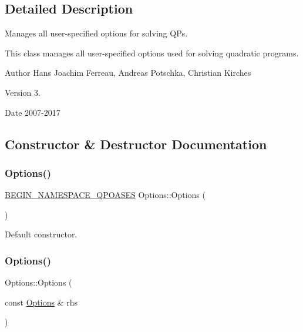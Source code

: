 \subsection{Detailed Description}
Manages all user-\/specified options for solving Q\+Ps. 

This class manages all user-\/specified options used for solving quadratic programs.

\begin{DoxyAuthor}{Author}
Hans Joachim Ferreau, Andreas Potschka, Christian Kirches 
\end{DoxyAuthor}
\begin{DoxyVersion}{Version}
3. 
\end{DoxyVersion}
\begin{DoxyDate}{Date}
2007-\/2017 
\end{DoxyDate}


\subsection{Constructor \& Destructor Documentation}
\mbox{\label{class_options_aeaece707f540fe3efef777a934e3d273}} 
\subsubsection{\texorpdfstring{Options()}{Options()}\hspace{0.1cm}{\footnotesize\ttfamily [1/2]}}
{\footnotesize\ttfamily \hyperlink{_types_8hpp_afd127fcb3c8f47975e9fa0ec2bacde52}{B\+E\+G\+I\+N\+\_\+\+N\+A\+M\+E\+S\+P\+A\+C\+E\+\_\+\+Q\+P\+O\+A\+S\+ES} Options\+::\+Options (\begin{DoxyParamCaption}{ }\end{DoxyParamCaption})}

Default constructor. \mbox{\label{class_options_ad9215a27608868991e0cd3e9081cb3b4}} 
\subsubsection{\texorpdfstring{Options()}{Options()}\hspace{0.1cm}{\footnotesize\ttfamily [2/2]}}
{\footnotesize\ttfamily Options\+::\+Options (\begin{DoxyParamCaption}\item[{const \hyperlink{class_options}{Options} \&}]{rhs }\end{DoxyParamCaption})}

